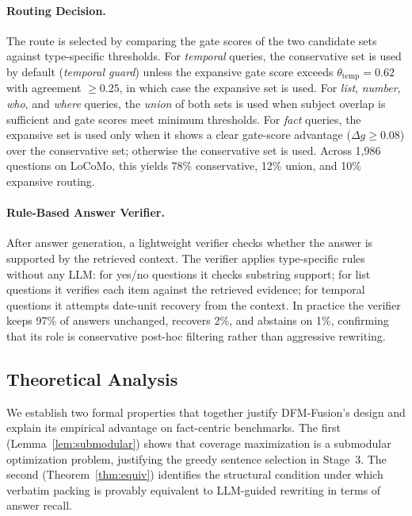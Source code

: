 \paragraph{Routing Decision.}
The route is selected by comparing the gate scores of the two candidate sets against type-specific thresholds.
For \textit{temporal} queries, the conservative set is used by default (\textit{temporal guard}) unless the expansive gate score exceeds $\theta_{\text{temp}}=0.62$ with agreement $\geq 0.25$, in which case the expansive set is used.
For \textit{list}, \textit{number}, \textit{who}, and \textit{where} queries, the \textit{union} of both sets is used when subject overlap is sufficient and gate scores meet minimum thresholds.
For \textit{fact} queries, the expansive set is used only when it shows a clear gate-score advantage ($\Delta g \geq 0.08$) over the conservative set; otherwise the conservative set is used.
Across 1,986 questions on LoCoMo, this yields 78\% conservative, 12\% union, and 10\% expansive routing.

\paragraph{Rule-Based Answer Verifier.}
After answer generation, a lightweight verifier checks whether the answer is supported by the retrieved context.
The verifier applies type-specific rules without any LLM: for yes/no questions it checks substring support; for list questions it verifies each item against the retrieved evidence; for temporal questions it attempts date-unit recovery from the context.
In practice the verifier keeps 97\% of answers unchanged, recovers 2\%, and abstains on 1\%, confirming that its role is conservative post-hoc filtering rather than aggressive rewriting.

\subsection{Theoretical Analysis}
\label{sec:theory}

We establish two formal properties that together justify DFM-Fusion's design and explain its empirical advantage on fact-centric benchmarks.
The first (Lemma~\ref{lem:submodular}) shows that coverage maximization is a submodular optimization problem, justifying the greedy sentence selection in Stage~3.
The second (Theorem~\ref{thm:equiv}) identifies the structural condition under which verbatim packing is provably equivalent to LLM-guided rewriting in terms of answer recall.

